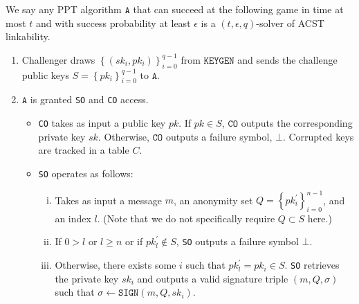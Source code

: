 \documentclass{llncs}
\newcommand{\A}{\texttt{A}}
\begin{document}
\begin{definition}\label{def:acst-link-adv}
We say any PPT algorithm $\A$ that can succeed at the following game in time at most $t$ and with success probability at least $\epsilon$ is a $(t, \epsilon, q)$-solver of ACST linkability.

\begin{enumerate}
\item Challenger draws $\left\{(sk_i, pk_i)\right\}_{i=0}^{q-1}$ from $\texttt{KEYGEN}$ and sends the challenge public keys $S = \left\{pk_i\right\}_{i=0}^{q-1}$ to $\A$.

\item $\A$ is granted \texttt{SO} and \texttt{CO} access.
    \begin{itemize}
    \item \texttt{CO} takes as input a public key $pk$. If $pk \in S$, $\texttt{CO}$ outputs the corresponding private key $sk$. Otherwise, $\texttt{CO}$ outputs a failure symbol, $\bot$. Corrupted keys are tracked in a table $C$.

    \item \texttt{SO} operates as follows:
        \begin{enumerate}[(i)]
        \item Takes as input a message $m$, an anonymity set $Q = \left\{pk^\prime_i\right\}_{i=0}^{n-1}$, and an index $l$. (Note that we do not specifically require $Q \subset S$ here.)

        \item If $0 > l$ or $l \geq n$ or if $pk^\prime_l \notin S$, \texttt{SO} outputs a failure symbol $\bot$.

        \item Otherwise, there exists some $i$ such that $pk^\prime_l = pk_i \in S$. \texttt{SO} retrieves the private key $sk_i$ and outputs a valid signature triple $(m, Q, \sigma)$ such that $\sigma \leftarrow \texttt{SIGN}(m, Q, sk_i)$.
        \end{enumerate}
    \end{itemize}


\end{enumerate}
\end{definition}
\end{document}
